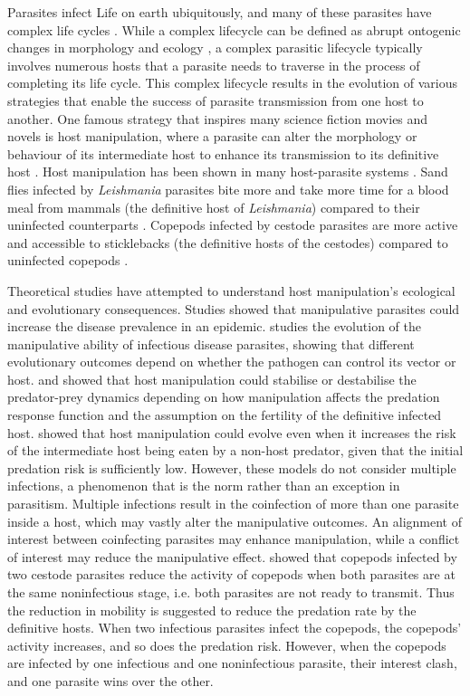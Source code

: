 \documentclass[11pt]{article}
\begin{document}
Parasites infect Life on earth ubiquitously, and many of these parasites have complex life cycles \cite{zimmer:book:2001}. 
While a complex lifecycle can be defined as abrupt ontogenic changes in morphology and ecology \cite{Benesh:2016dj}, a complex parasitic lifecycle typically involves numerous hosts that a parasite needs to traverse in the process of completing its life cycle. 
This complex lifecycle results in the evolution of various strategies that enable the success of parasite transmission from one host to another. 
One famous strategy that inspires many science fiction movies and novels is host manipulation, where a parasite can alter the morphology or behaviour of its intermediate host to enhance its transmission to its definitive host \cite{Hughes2012}. 
Host manipulation has been shown in many host-parasite systems \cite{Hughes2012, molyneux_jefferies1986}. 
Sand flies infected by \textit{Leishmania} parasites bite more and take more time for a blood meal from mammals (the definitive host of \textit{Leishmania}) compared to their uninfected counterparts \cite{ Rogers2007}. 
Copepods infected by cestode parasites are more active and accessible to sticklebacks (the definitive hosts of the cestodes) compared to uninfected copepods \cite{Wedekind1996}.


Theoretical studies have attempted to understand host manipulation's ecological and evolutionary consequences. 
Studies \cite{Roosien2013, Hosack2008} showed that manipulative parasites could increase the disease prevalence in an epidemic. \cite{Gandon2018} studies the evolution of the manipulative ability of infectious disease parasites, showing that different evolutionary outcomes depend on whether the pathogen can control its vector or host.
\cite{Hadeler1989, Fenton2006} and \cite{Rogawa2018} showed that host manipulation could stabilise or destabilise the predator-prey dynamics depending on how manipulation affects the predation response function and the assumption on the fertility of the definitive infected host. \cite{Seppl2008} showed that host manipulation could evolve even when it increases the risk of the intermediate host being eaten by a non-host predator, given that the initial predation risk is sufficiently low. 
However, these models do not consider multiple infections, a phenomenon that is the norm rather than an exception in parasitism. Multiple infections result in the coinfection of more than one parasite inside a host, which may vastly alter the manipulative outcomes. 
An alignment of interest between coinfecting parasites may enhance manipulation, while a conflict of interest may reduce the manipulative effect. 
\cite{Hafer:2015gl} showed that copepods infected by two cestode parasites reduce the activity of copepods when both parasites are at the same noninfectious stage, i.e. both parasites are not ready to transmit. Thus the reduction in mobility is suggested to reduce the predation rate by the definitive hosts. When two infectious parasites infect the copepods, the copepods' activity increases, and so does the predation risk. 
However, when the copepods are infected by one infectious and one noninfectious parasite, their interest clash, and one parasite wins over the other. 
\end{document}
